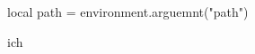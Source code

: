 \startluacode
local path = environment.arguemnt("path")
\stopluacode

\startMPpage
ich

\stopMPpage
